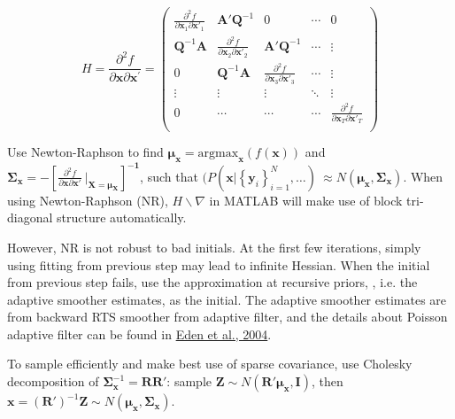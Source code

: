 \documentclass[]{article}
\begin{document}
\[H = \frac{\partial^{2}f}{\partial\mathbf{x}\partial\mathbf{x}^{'}} = \begin{pmatrix}
	\frac{\partial^{2}f}{\partial\mathbf{x}_{1}\partial\mathbf{x}'_{1}} & \mathbf{A'}\mathbf{Q}^{- 1} & 0 & \cdots & 0 \\
	\mathbf{Q}^{- 1}\mathbf{A} & \frac{\partial^{2}f}{\partial\mathbf{x}_{2}\partial\mathbf{x}'_{2}} & \mathbf{A'}\mathbf{Q}^{- 1} & \cdots & \vdots \\
	0 & \mathbf{Q}^{- 1}\mathbf{A} & \frac{\partial^{2}f}{\partial\mathbf{x}_{3}\partial\mathbf{x}'_{3}} & \cdots & \vdots \\
	\vdots & \vdots & \vdots & \ddots & \vdots \\
	0 & \cdots & \cdots & \cdots & \frac{\partial^{2}f}{\partial\mathbf{x}_{T}\partial\mathbf{x}'_{T}} \\
\end{pmatrix}\]

Use Newton-Raphson to find
\(\bm{\mu}_{\mathbf{x}} =\text{argmax}_{\mathbf{x}}\left( f\left( \mathbf{x} \right) \right)\)
and \(\mathbf{\Sigma}_{\mathbf{x}}= -\left\lbrack \frac{\partial^{2}f}{\partial\mathbf{x}\partial\mathbf{x}'}\left. \ \mathbf{} \right|_{\mathbf{X} = \bm{\mu}_{\mathbf{X}}} \right\rbrack^{\mathbf{- 1}}\), such that \((P(\mathbf{x}|\left\{ \mathbf{y}_{i} \right\}_{i = 1}^{N},\ldots)\ \approx N\left(\bm{\mu}_{\mathbf{x}}, \mathbf{\Sigma}_{\mathbf{x}}\right)\).
When using Newton-Raphson (NR), \(H\backslash\nabla\) in MATLAB will make use
of block tri-diagonal structure automatically.

However, NR is not robust to bad initials. At the first few iterations, simply using fitting from previous step may lead to infinite Hessian. When the initial from previous step fails, use the approximation at recursive priors, , i.e. the adaptive smoother estimates, as the initial. The adaptive smoother estimates are from backward RTS smoother from adaptive filter, and the details about Poisson adaptive filter can be found in  \href{http://www.stat.columbia.edu/~liam/teaching/neurostat-spr11/papers/brown-et-al/eden2004.pdf}{Eden et al., 2004}.

To sample efficiently and make best use of sparse covariance, use Cholesky decomposition of
\(\mathbf{\Sigma}_{\mathbf{x}}^{- 1} = \mathbf{R}\mathbf{R}'\):
sample
\(\mathbf{Z} \sim N(\mathbf{R}'\mathbf{\mu}_{\mathbf{x}},\mathbf{I})\),
then
\(\mathbf{x} = \left( \mathbf{R}' \right)^{- 1}\mathbf{Z} \sim N(\bm{\mu}_{\mathbf{x}},\mathbf{\Sigma}_{\mathbf{x}})\).   
\end{document}
